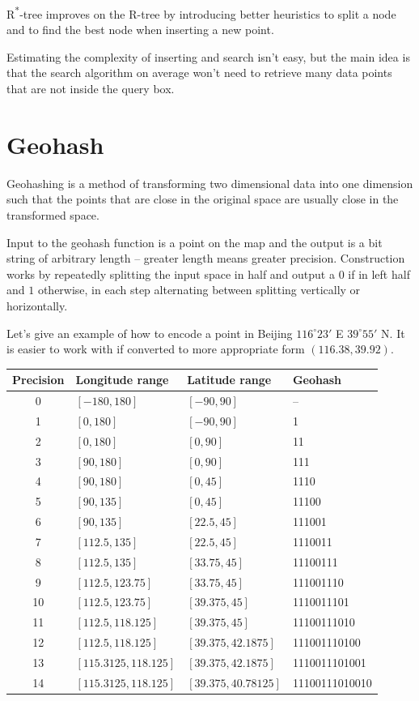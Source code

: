 \documentclass[times, utf8, diplomski]{fer}
\newcommand{\rstar}{R\textsuperscript{*}}
\begin{document}
\rstar-tree improves on the R-tree by introducing better heuristics to split a node and to find the best node when inserting a new point.

Estimating the complexity of inserting and search isn't easy, but the main idea is that the search algorithm on average won't need to retrieve many data points that are not inside the query box.

\section{Geohash} \label{geohashing}
Geohashing is a method of transforming two dimensional data into one dimension such that the points that are close in the original space are usually close in the transformed space.

Input to the geohash function is a point on the map and the output is a bit string of arbitrary length -- greater length means greater precision. Construction works by repeatedly splitting the input space in half and output a $0$ if in left half and $1$ otherwise, in each step alternating between splitting vertically or horizontally.

Let's give an example of how to encode a point in Beijing $116^{\circ}23'$ E $39^{\circ}55'$ N. It is easier to work with if converted to more appropriate form $(116.38, 39.92)$. 

\begin{center}
\begin{tabular}{ |c|l|l|l| } 
	\hline
	Precision & Longitude range & Latitude range & Geohash \\
	\hline
	0 & $[-180, 180]$ & $[-90, 90]$ & -- \\ 
	1 & $[0, 180]$ & $[-90, 90]$ & 1 \\ 
	2 & $[0, 180]$ & $[0, 90]$ & 11 \\ 
	3 & $[90, 180]$ & $[0, 90]$ & 111 \\ 
	4 & $[90, 180]$ & $[0, 45]$ & 1110 \\ 
	5 & $[90, 135]$ & $[0, 45]$ & 11100 \\ 
	6 & $[90, 135]$ & $[22.5, 45]$ & 111001 \\ 
	7 & $[112.5, 135]$ & $[22.5, 45]$ & 1110011 \\ 
	8 & $[112.5, 135]$ & $[33.75, 45]$ & 11100111 \\ 
	9 & $[112.5, 123.75]$ & $[33.75, 45]$ & 111001110 \\ 
	10 & $[112.5, 123.75]$ & $[39.375, 45]$ & 1110011101 \\ 
	11 & $[112.5, 118.125]$ & $[39.375, 45]$ & 11100111010 \\ 
	12 & $[112.5, 118.125]$ & $[39.375, 42.1875]$ & 111001110100 \\ 
	13 & $[115.3125, 118.125]$ & $[39.375, 42.1875]$ & 1110011101001 \\ 
	14 & $[115.3125, 118.125]$ & $[39.375, 40.78125]$ & 11100111010010 \\ 
	\hline
\end{tabular}
\end{center}
\end{document}
